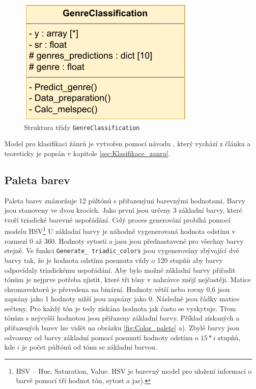 \begin{figure}[H]
    \centering
    \includegraphics[width = 0.3\linewidth]{obrazky/UML_diagramy_GenreClassification.pdf}
    \caption{Struktura třídy \texttt{GenreClassification}}
    \label{fig:GenreClassification_diagram}
\end{figure}

Model pro klasifikaci žánrů je vytvořen pomocí návodu  \cite{Music_classification_using_deep_learning}, který vychází z článku \cite{Music_genre_classification_paper} a teoreticky je popsán v kapitole \ref{sec:Klasifikace_zanru}. 


\subsection{Paleta barev} \label{sec:Color_palete}

Paleta barev znázorňuje 12 půltónů s přiřazenými barevnými hodnotami. Barvy jsou stanoveny ve dvou krocích. Jako první jsou určeny 3 základní barvy, které tvoří triadické barevné uspořádání. Celý proces generování probíhá pomocí modelu \acs{HSV}\footnote{HSV -- Hue, Saturation, Value. HSV je barevný model pro uložení informací o barvě pomocí tří hodnot tón, sytost a jas).} U základní barvy je náhodně vygenerovaná hodnota odstínu v rozmezí 0 až 360. Hodnoty sytosti a jasu jsou přednastavené pro všechny barvy stejně. Ve funkci \texttt{Generate\_ triadic\_colors} jsou vygenerovány zbývající dvě barvy tak, že je hodnota odstínu posunuta vždy o 120 stupňů aby barvy odpovídaly triadickému uspořádání. Aby bylo možné základní barvy přiřadit tónům je nejprve potřeba zjistit, které tři tóny v nahrávce znějí nejčastěji. Matice chromavektorů je převedena na binární. Hodnoty větší nebo rovny 0,6 jsou zapsány jako 1 hodnoty nižší jsou zapsány jako 0. Následně jsou řádky matice sečteny. Pro každý tón je tedy získána hodnota jak často se vyskytuje. Třem tónům s nejvyšší hodnotou jsou přiřazeny základní barvy. Příklad získaných a přiřazených barev lze vidět na obrázku \ref{fig:Color_palete} a). Zbylé barvy jsou odvozeny od barvy základní pomocí posunutí hodnoty odstínu o $15*i$ stupňů, kde $i$ je počet půltónů od tónu se základní barvou.

